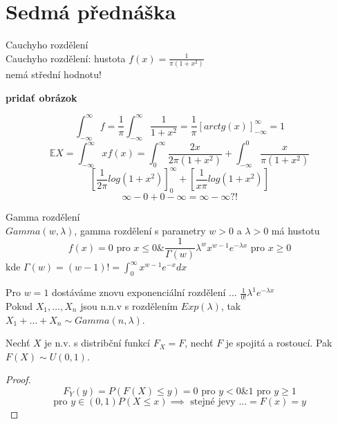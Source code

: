 \documentclass[../main.tex]{subfiles}
\begin{document}
\section{Sedmá přednáška}


\begin{definition}
    Cauchyho rozdělení\\

    Cauchyho rozdělení: hustota $f(x) = \frac{1}{\pi (1+x^2)}$\\
    nemá střední hodnotu!

    \textbf{pridať obrázok}
    \begin{remark}
        \[\int^\infty_{-\infty} f = \frac{1}{\pi} \int^\infty_{-\infty} \frac{1}{1+x^2} = \frac{1}{\pi}\left[arctg(x)\right]^\infty_{-\infty} = 1\]
        \[\mathbb{E}X = \int^\infty_{-\infty} x f(x) = \int^\infty_0 \frac{2x}{2\pi (1+x^2)} + \int^0_{-\infty}\frac{x}{\pi (1+x^2)}\]
        \[\left[\frac{1}{2\pi}log(1+x^2)\right]^\infty_0 + \left[\frac{1}{x\pi} log(1+x^2)\right]\]
        \[\infty - 0 + 0- \infty = \infty - \infty ?!\]
    \end{remark}
    
\end{definition}

\begin{definition}
    Gamma rozdělení\\

    $Gamma(w,\lambda)$, gamma rozdělení s parametry $w > 0$ a $\lambda > 0$ má hustotu
    \[f(x) = 0 \text{ pro } x \leq 0 \& \frac{1}{\Gamma(w)}\lambda^w x^{w-1} e^{-\lambda x} \text{ pro } x\geq 0\]
    kde $\Gamma(w) = (w-1)! = \int^\infty_0 x^{w-1}e^{-x}dx$

    Pro $w = 1$ dostáváme znovu exponenciální rozdělení ... $\frac{1}{0!}\lambda^1 e^{-\lambda x}$\\
    Pokud $X_1,\dots ,X_n$ jsou n.n.v s rozdělením $Exp(\lambda)$, tak $X_1 + \dots + X_n \sim Gamma(n, \lambda)$.  
\end{definition}
\begin{theorem}
    Nechť $X$ je n.v. s distribční funkcí $F_X = F$, nechť $F$ je spojitá a rostoucí. Pak $F(X) \sim U(0,1)$.\\
    
    \begin{proof}
        \[F_Y(y) = P(F(X) \leq y) = 0 \text{ pro } y < 0 \& 1 \text{ pro } y \geq 1\]
        \[\text{pro } y \in (0,1) P(X \leq x) \implies \text{ stejné jevy } \dots = F(x) = y\]
    \end{proof}
\end{theorem}
\end{document}
